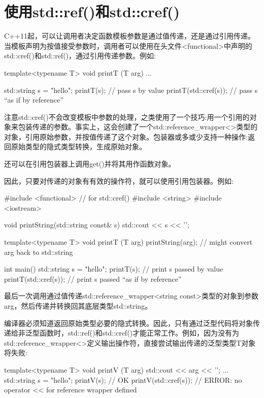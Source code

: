 \section{使用std::ref()和std::cref()}
C++11起，可以让调用者决定函数模板参数是通过值传递，还是通过引用传递。当模板声明为按值接受参数时，调用者可以使用在头文件<functional>中声明的std::cref()和std::ref()，通过引用传递参数。例如:

\begin{cpp}
template<typename T>
void printT (T arg) {
	...
}

std::string s = "hello";
printT(s); // pass s by value
printT(std::cref(s)); // pass s “as if by reference”
\end{cpp}

注意std::cref()不会改变模板中参数的处理，之类使用了一个技巧:用一个引用的对象来包装传递的参数。事实上，这会创建了一个std::reference\_wrapper<>类型的对象，引用原始参数，并按值传递了这个对象。包装器或多或少支持一种操作:返回原始类型的隐式类型转换，生成原始对象。

\begin{notice}
还可以在引用包装器上调用get()并将其用作函数对象。
\end{notice}

因此，只要对传递的对象有有效的操作符，就可以使用引用包装器。例如:

\begin{cpp}
#include <functional> // for std::cref()
#include <string>
#include <iostream>

void printString(std::string const& s)
{
	std::cout << s << ’\n’;
}

template<typename T>
void printT (T arg)
{
	printString(arg); // might convert arg back to std::string
}

int main()
{
	std::string s = "hello";
	printT(s); // print s passed by value
	printT(std::cref(s)); // print s passed “as if by reference”
}
\end{cpp}

最后一次调用通过值传递std::reference\_wrapper<string const>类型的对象到参数arg，然后传递并转换回其底层类型std::string。

编译器必须知道返回原始类型必要的隐式转换。因此，只有通过泛型代码将对象传递给非泛型函数时，std::ref()和std::cref()才能正常工作。例如，因为没有为std::reference\_wrapper<>定义输出操作符，直接尝试输出传递的泛型类型T对象将失败:

\begin{cpp}
template<typename T>
void printV (T arg) {
	std::cout << arg << ’\n’;
}
...
std::string s = "hello";
printV(s); // OK
printV(std::cref(s)); // ERROR: no operator << for reference wrapper defined
\end{cpp}

